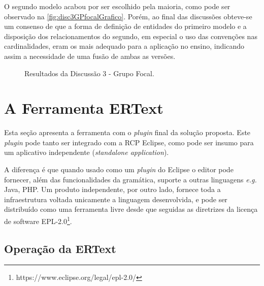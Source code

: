 O segundo modelo acabou por ser escolhido pela maioria, como pode ser observado na \autoref{fig:disc3GPfocalGrafico}.
Porém, ao final das discussões obteve-se um consenso de que a forma de definição de entidades do primeiro modelo e a disposição dos relacionamentos do segundo, em especial o uso das convenções nas cardinalidades, eram os mais adequado para a aplicação no ensino, indicando assim a necessidade de uma fusão de ambas as versões.

\begin{figure}[!htb]
    \centering
    \caption{Resultados da Discussão 3 - Grupo Focal.}
    \label{fig:disc3GPfocalGrafico}
    
\end{figure}


\section{A Ferramenta ERText} \label{sec:ERTEXTFinal}

Esta seção apresenta a ferramenta com o \textit{plugin} final da solução proposta. 
Este \textit{plugin} pode tanto ser integrado com a \ac{RCP} Eclipse, como pode ser insumo para um aplicativo independente (\textit{standalone application}).

A diferença é que quando usado como um \textit{plugin} do Eclipse o editor pode fornecer, além das funcionalidades da gramática, suporte a outras linguagens \textit{e.g.} Java, PHP. 
Um produto independente, por outro lado, fornece toda a infraestrutura voltada unicamente a linguagem desenvolvida, e pode ser distribuído como uma ferramenta livre desde que seguidas as diretrizes da licença de software EPL-2.0\footnote{https://www.eclipse.org/legal/epl-2.0/}.

\subsection{Operação da ERText}

